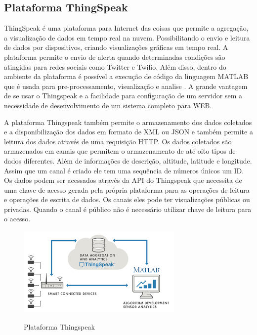 \subsection{Plataforma ThingSpeak}

ThingSpeak é uma plataforma para Internet das coisas que permite a agregação, a visualização de dados em tempo real na nuvem. Possibilitando o envio e leitura de dados por dispositivos, criando visualizações gráficas em tempo real. A plataforma permite o envio de alerta quando determinadas condições são atingidas para redes sociais como Twitter e Twilio. Além disso, dentro do ambiente da plataforma é possível a execução de código da linguagem MATLAB que é usada para pre-processamento, visualização e analise \cite{ThinkSpeak}. A grande vantagem de se usar o Thingspeak e a facilidade para configuração de um servidor sem a necessidade de desenvolvimento de um sistema completo para WEB.

A plataforma Thingspeak também permite o armazenamento dos dados coletados e a disponibilização dos dados em formato de XML ou JSON e também permite a leitura dos dados através de uma requisição HTTP. Os dados coletados são armazenados em canais que permitem o armazenamento de até oito tipos de dados diferentes. Além de informações de descrição, altitude, latitude e longitude. Assim que um canal é criado ele tem uma sequência de números únicos um ID. Os dados podem ser acessados através da API do Thingspeak que necessita de uma chave de acesso gerada pela própria plataforma para as operações de leitura e operações de escrita de dados. Os canais eles pode ter visualizações públicas ou privadas. Quando o canal é público não é necessário utilizar chave de leitura para o acesso.

\begin{figure}[h!]
    \centering
    \caption{Plataforma Thingspeak}
    \includegraphics{Figuras/think_speak.png}
    \label{fig:thinkSpeak}
\end{figure}

